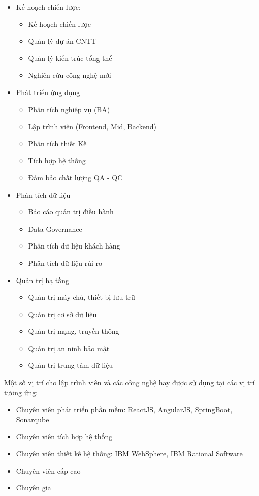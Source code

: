 \documentclass[14pt, a4paper]{article}
\numberwithin{equation}{section}
\numberwithin{figure}{section}
\numberwithin{dl}{section}
\numberwithin{md}{section}
\numberwithin{bd}{section}
\numberwithin{dn}{section}
\numberwithin{hq}{section}
\begin{document}
    \begin{itemize}
        \item Kế hoạch chiến lược:
        \begin{itemize}
            \item Kế hoạch chiến lược
            \item Quản lý dự án CNTT
            \item Quản lý kiến trúc tổng thể
            \item Nghiên cứu công nghệ mới
        \end{itemize}
        \item Phát triển ứng dụng
        \begin{itemize}
            \item Phân tích nghiệp vụ (BA)
            \item Lập trình viên (Frontend, Mid, Backend)
            \item Phân tích thiết Kế
            \item Tích hợp hệ thống
            \item Đảm bảo chất lượng QA - QC
        \end{itemize}
        \item Phân tích dữ liệu
        \begin{itemize}
            \item Báo cáo quản trị điều hành
            \item Data Governance
            \item Phân tích dữ liệu khách hàng
            \item Phân tích dữ liệu rủi ro
        \end{itemize}
        \item Quản trị hạ tầng
        \begin{itemize}
            \item Quản trị máy chủ, thiết bị lưu trữ
            \item Quản trị cơ sở dữ liệu
            \item Quản trị mạng, truyền thông
            \item Quản trị an ninh bảo mật
            \item Quản trị trung tâm dữ liệu
        \end{itemize}
    \end{itemize}

    Một số vị trí cho lập trình viên và các công nghệ hay được sử dụng tại các vị trí tương ứng:

    \begin{itemize}
        \item Chuyên viên phát triển phần mềm: ReactJS, AngularJS, SpringBoot, Sonarqube
        \item Chuyên viên tích hợp hệ thống
        \item Chuyên viên thiết kế hệ thống: IBM WebSphere, IBM Rational Software
        \item Chuyên viên cấp cao
        \item Chuyên gia
    \end{itemize}
\end{document}
